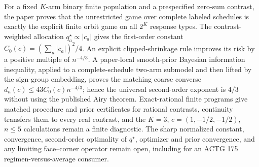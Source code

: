 For a fixed \(K\)-arm binary finite population and a prespecified zero-sum contrast, the paper proves that the unrestricted game over complete labeled schedules is exactly the explicit finite orbit game on all \(2^K\) response types. The contrast-weighted allocation \(q_a^\star\propto|c_a|\) gives the first-order constant \(C_0(c)=(\sum_a|c_a|)^2/4\). An explicit clipped-shrinkage rule improves its risk by a positive multiple of \(n^{-4/3}\). A paper-local smooth-prior Bayesian information inequality, applied to a complete-schedule two-arm submodel and then lifted by the sign-group embedding, proves the matching coarse converse \(d_n(c)\leq43C_0(c)n^{-4/3}\); hence the universal second-order exponent is \(4/3\) without using the published Airy theorem. Exact-rational finite programs give matched procedure and prior certificates for rational contrasts, continuity transfers them to every real contrast, and the \(K=3\), \(c=(1,-1/2,-1/2)\), \(n\leq5\) calculations remain a finite diagnostic. The sharp normalized constant, convergence, second-order optimality of \(q^\star\), optimizer and prior convergence, and any limiting face--corner operator remain open, including for an ACTG 175 regimen-versus-average consumer.